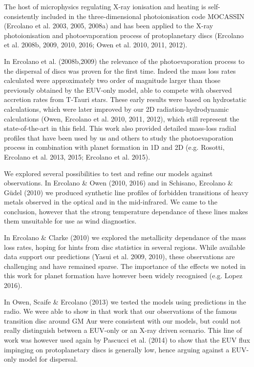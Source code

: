 \documentclass[10pt,fleqn,twoside]{article}
\begin{document}
 The host of microphysics regulating
X-ray ionisation and heating is self-consistently included in the
three-dimensional photoionisation code MOCASSIN (Ercolano et al. 2003,
2005, 2008a) and has been applied to the X-ray photoionisation and
photoevaporation process of protoplanetary discs (Ercolano et
al. 2008b, 2009, 2010, 2016; Owen et al. 2010, 2011, 2012). 

In Ercolano et al. (2008b,2009) the relevance of the photoevaporation process
to the dispersal of discs was proven for the first time. Indeed the mass
loss rates calculated were approximately two order of magnitude larger
than those previously obtained by the EUV-only model, able to compete
with observed accretion rates from T-Tauri stars. These early results
were based on hydrostatic calculations, which were later improved by
our 2D radiation-hydrodynamic calculations (Owen, Ercolano et
al. 2010, 2011, 2012), which still represent the state-of-the-art in
this field. This work also provided detailed mass-loss radial profiles
that have been used by us and others to study the photoevaporation
process in combination with planet formation in 1D and 2D
(e.g. Rosotti, Ercolano et al. 2013, 2015; Ercolano et al. 2015). 

We explored several possibilities to test and refine our
models against observations. In Ercolano \& Owen (2010, 2016) and in
Schisano, Ercolano \& G\"udel (2010) we
produced synthetic line profiles of forbidden transitions of heavy
metals observed in the optical and in the mid-infrared. We came to the
conclusion, however that the strong temperature dependance of these
lines makes them unsuitable for use as wind diagnostics. 

In Ercolano
\& Clarke (2010) we explored the metallicity dependance of the mass
loss rates, hoping for hints from disc statistics in several
regions. While available data support our predictions (Yasui
et al. 2009, 2010), these observations are challenging and have
remained sparse. The importance of the effects we noted in this
work for planet formation have however been widely recognised
(e.g. Lopez 2016). 

In Owen, Scaife \& Ercolano (2013) we tested the models using
predictions in the radio. We were able to show in that work that our
observations of the famous transition disc around GM Aur were
consistent with our models, but could not really distinguish between
a EUV-only or an X-ray driven scenario. This line of work was however
used again by Pascucci et al. (2014) to show that the EUV flux
impinging on protoplanetary discs is generally low, hence arguing
against a EUV-only model for dispersal. 
\end{document}
